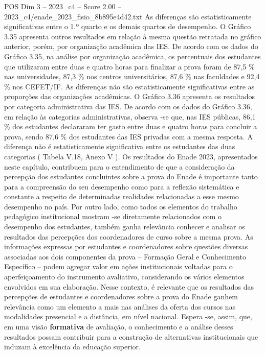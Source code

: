 \begin{textsample}{POS Dim 3 – 2023\_c4 – Score 2.00 – 2023\_c4/enade\_2023\_fisio\_8b895e4d42.txt}
As diferenças são estatisticamente significativas entre o 1.º quarto e os demais quartos de desempenho.
O Gráfico 3.35 apresenta outros resultados em relação à mesma questão retratada no gráfico anterior, porém, por organização acadêmica das IES.
De acordo com os dados do Gráfico 3.35, na análise por organização acadêmica, os percentuais dos estudantes que utilizaram entre duas e quatro horas para finalizar a prova foram de 87,5 \% nas universidades, 87,3 \% nos centros universitários, 87,6 \% nas faculdades e 92,4 \% nos CEFET/IF.
As diferenças não são estatisticamente significativas entre as proporções das organizações acadêmicas.
O Gráfico 3.36 apresenta os resultados por categoria administrativa das IES.
De acordo com os dados do Gráfico 3.36, em relação às categorias administrativas, observa -se que, nas IES públicas, 86,1 \% dos estudantes declararam ter gasto entre duas e quatro horas para concluir a prova, sendo 87,6 \% dos estudantes das IES privadas com a mesma resposta.
A diferença não é estatisticamente significativa entre os estudantes das duas categorias ( Tabela V.18, Anexo V ).
Os resultados do Enade 2023, apresentados neste capítulo, contribuem para o entendimento de que a consideração da percepção dos estudantes concluintes sobre a prova do Enade é importante tanto para a compreensão do seu desempenho como para a reflexão sistemática e constante a respeito de determinadas realidades relacionadas a esse mesmo desempenho no país.
Por outro lado, como todos os elementos do trabalho pedagógico institucional mostram -se diretamente relacionados com o desempenho dos estudantes, também ganha relevância conhecer e analisar os resultados das percepções dos coordenadores de curso sobre a mesma prova.
As informações expressas por estudantes e coordenadores sobre questões diversas associadas aos dois componentes da prova – Formação Geral e Conhecimento Específico – podem agregar valor em ações institucionais voltadas para o aperfeiçoamento do instrumento avaliativo, considerando os vários elementos envolvidos em sua elaboração.
Nesse contexto, é relevante que os resultados das percepções de estudantes e coordenadores sobre a prova do Enade ganhem relevância como um elemento a mais nas análises da oferta dos cursos nas modalidades presencial e a distância, em nível nacional.
Espera -se, assim, que, em uma visão \textbf{formativa} de avaliação, o conhecimento e a análise desses resultados possam contribuir para a construção de alternativas institucionais que induzam à excelência da educação superior.

\end{textsample}
